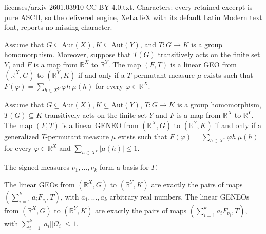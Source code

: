 \documentclass[10pt,a4paper]{amsart}
\newcommand{\R}{\mathbb{R}}
\begin{document}
licenses/arxiv-2601.03910-CC-BY-4.0.txt. Characters: every retained excerpt is pure ASCII, so the delivered engine, XeLaTeX with its default Latin Modern text font, reports no missing character.
\begin{theorem}
    \label{maint} 
    Assume that $G \subseteq \mathrm{Aut}(X), K \subseteq \mathrm{Aut}(Y)$, and $T \colon G \to K$ is a group homomorphism. Moreover, suppose that $T(G)$ transitively acts on the finite set $Y$, and $F$ is a map from $\mathbb{R}^X$ to $\mathbb{R}^Y$. The map $(F,T)$ is a linear GEO from $(\mathbb{R}^X, G)$ to $(\mathbb{R}^Y, K)$ if and only if a $T$-permutant measure $\mu$ exists such that $F(\varphi) = \sum_{h \in X^Y} \varphi h\  \mu(h)$ for every $\varphi \in \mathbb{R}^X$.
\end{theorem}

\begin{theorem}
    \label{teo:linear}
    Assume that $G \subseteq \mathrm{Aut}(X), K \subseteq \mathrm{Aut}(Y)$, $T \colon G \to K$ is a group homomorphism, $T(G) \subseteq K$ transitively acts on the finite set $Y$ and $F$ is a map from $\mathbb{R}^X$ to $\mathbb{R}^Y$. The map $(F,T)$ is a linear GENEO from $(\mathbb{R}^X, G)$ to $(\mathbb{R}^Y, K)$ if and only if a generalized $T$-permutant measure $\mu$ exists such that $F(\varphi) = \sum_{h \in X^Y} \varphi h \ \mu(h)$ for every $\varphi \in \mathbb{R}^X$ and $\sum_{h \in X^Y} \left| \mu(h) \right| \le 1$.
\end{theorem}

\begin{proposition}
\label{prop:convexity}
The signed measures $\nu_1, \ldots, \nu_k$ form a basis for $\Gamma$.
\end{proposition}

\begin{corollary}
\label{cor:convexity}
The linear GEOs from $(\R^X,G)$ to $(\R^Y,K)$ are exactly the pairs of maps  
$(\sum_{i=1}^k a_i F_{\nu_i},T)$, with $a_1,\ldots,a_k$ arbitrary real numbers. The linear GENEOs from $(\R^X,G)$ to $(\R^Y,K)$ are exactly the pairs of maps $(\sum_{i=1}^k a_i F_{\nu_i},T)$, with  $\sum_{i=1}^k |a_i||\mathcal{O}_i|\le 1$.
\end{corollary}
\end{document}
